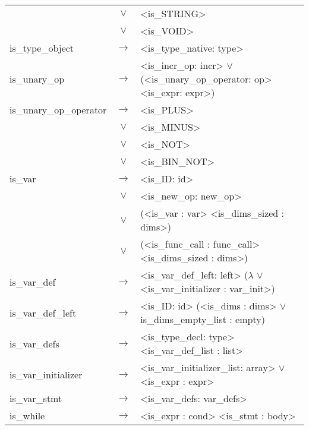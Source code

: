 \documentclass[a4paper]{article}
\begin{document}
\begin{longtable}{lcl}
								& $\vee$ & <is\_STRING> \\
								& $\vee$ & <is\_VOID> \\
	is\_type\_object			& $\to$ & <is\_type\_native: type> \\
	is\_unary\_op				& $\to$ & <is\_incr\_op: incr> $\vee$ (<is\_unary\_op\_operator: op> <is\_expr: expr>) \\
	is\_unary\_op\_operator		& $\to$ & <is\_PLUS> \\
								& $\vee$ & <is\_MINUS> \\
								& $\vee$ & <is\_NOT> \\
								& $\vee$ & <is\_BIN\_NOT> \\
	is\_var					 	& $\to$ & <is\_ID: id> \\
								& $\vee$ & <is\_new\_op: new\_op> \\
								& $\vee$ & (<is\_var : var> <is\_dims\_sized : dims>) \\
								& $\vee$ & (<is\_func\_call : func\_call> <is\_dims\_sized : dims>) \\
	is\_var\_def			 	& $\to$ & <is\_var\_def\_left: left> ($\lambda$ $\vee$ <is\_var\_initializer : var\_init>) \\
	is\_var\_def\_left		 	& $\to$ & <is\_ID: id> (<is\_dims : dims> $\vee$ is\_dims\_empty\_list : empty) \\
	is\_var\_defs		 		& $\to$ & <is\_type\_decl: type> <is\_var\_def\_list : list> \\
	is\_var\_initializer 		& $\to$ & <is\_var\_initializer\_list: array> $\vee$ <is\_expr : expr> \\
	is\_var\_stmt				& $\to$ & <is\_var\_defs: var\_defs> \\	
	is\_while 					& $\to$ & <is\_expr : cond> <is\_stmt : body> \\
\end{longtable}
\end{document}
